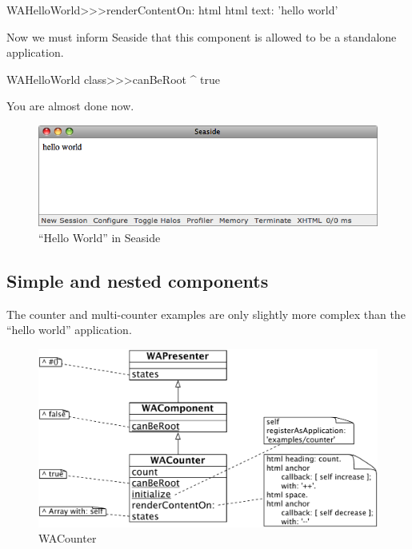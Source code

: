 \documentclass[a4paper,10pt,twoside]{book}
\begin{document}
\begin{code}{}
WAHelloWorld>>>renderContentOn: html
	html text: 'hello world'
\end{code}

Now we must inform Seaside that this component is allowed to be a standalone application.


\begin{code}{}
WAHelloWorld class>>>canBeRoot
	^ true
\end{code}

You are almost done now.


\begin{figure}[ht]
\begin{center}
\includegraphics[width=\textwidth]{WAHelloWorld}
\caption{``Hello World'' in Seaside}
\label{fig:WAHelloWorld}
\end{center}
\end{figure}

\subsection{Simple and nested components}

The counter and multi-counter examples are only slightly more complex than the ``hello world'' application.

\begin{figure}[ht]
\begin{center}
\includegraphics[width=\textwidth]{WACounter}
\caption{WACounter}
\label{fig:WACounter}
\end{center}
\end{figure}
\end{document}
